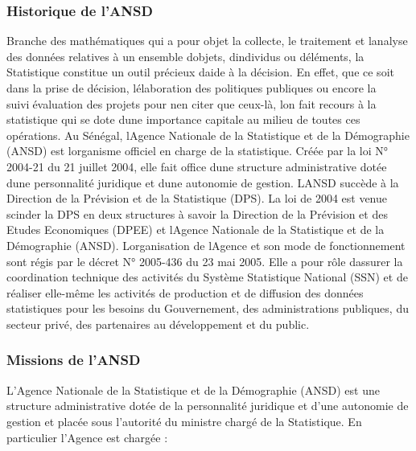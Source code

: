 \documentclass[
  letterpaper,
  DIV=11,
  numbers=noendperiod]{scrartcl}
\begin{document}
\hypertarget{historique-de-lansd}{%
\subsubsection{Historique de l'ANSD}\label{historique-de-lansd}}

Branche des mathématiques qui a pour objet la collecte, le traitement et
l\textquotesingle analyse des données relatives à un ensemble
d\textquotesingle objets, d\textquotesingle individus ou
d\textquotesingle éléments, la Statistique constitue un outil précieux
d\textquotesingle aide à la décision. En effet, que ce soit dans la
prise de décision, l\textquotesingle élaboration des politiques
publiques ou encore la suiviévaluation des projets pour
n\textquotesingle en citer que ceux-là, l\textquotesingle on fait
recours à la statistique qui se dote d\textquotesingle une importance
capitale au milieu de toutes ces opérations. Au Sénégal,
l\textquotesingle Agence Nationale de la Statistique et de la
Démographie (ANSD) est l\textquotesingle organisme officiel en charge de
la statistique. Créée par la loi N° 2004-21 du 21 juillet 2004, elle
fait office d\textquotesingle une structure administrative dotée
d\textquotesingle une personnalité juridique et d\textquotesingle une
autonomie de gestion. L\textquotesingle ANSD succède à la Direction de
la Prévision et de la Statistique (DPS). La loi de 2004 est venue
scinder la DPS en deux structures à savoir la Direction de la Prévision
et des Etudes Economiques (DPEE) et l\textquotesingle Agence Nationale
de la Statistique et de la Démographie (ANSD).
L\textquotesingle organisation de l\textquotesingle Agence et son mode
de fonctionnement sont régis par le décret N° 2005-436 du 23 mai 2005.
Elle a pour rôle d\textquotesingle assurer la coordination technique des
activités du Système Statistique National (SSN) et de réaliser elle-même
les activités de production et de diffusion des données statistiques
pour les besoins du Gouvernement, des administrations publiques, du
secteur privé, des partenaires au développement et du public.

\hypertarget{missions-de-lansd}{%
\subsubsection{Missions de l'ANSD}\label{missions-de-lansd}}

L'Agence Nationale de la Statistique et de la Démographie (ANSD) est une
structure administrative dotée de la personnalité juridique et d'une
autonomie de gestion et placée sous l'autorité du ministre chargé de la
Statistique. En particulier l'Agence est chargée :
\end{document}

